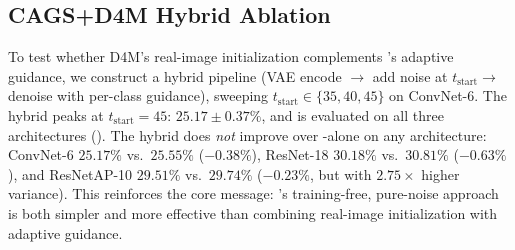 \subsection{CAGS+D4M Hybrid Ablation}
\label{sec:hybrid-ablation}

To test whether D4M's real-image initialization complements \cags{}'s adaptive guidance, we construct a hybrid pipeline (VAE encode $\to$ add noise at $t_{\text{start}} \to$ denoise with per-class \cags{} guidance), sweeping $t_{\text{start}} \in \{35, 40, 45\}$ on ConvNet-6. The hybrid peaks at $t_{\text{start}}{=}45$: $25.17 \pm 0.37\%$, and is evaluated on all three architectures (). The hybrid does \emph{not} improve over \cags{}-alone on any architecture: ConvNet-6 $25.17\%$ vs.\ $25.55\%$ ($-0.38\%$), ResNet-18 $30.18\%$ vs.\ $30.81\%$ ($-0.63\%$), and ResNetAP-10 $29.51\%$ vs.\ $29.74\%$ ($-0.23\%$, but with $2.75\times$ higher variance). This reinforces the core message: \cags{}'s training-free, pure-noise approach is both simpler and more effective than combining real-image initialization with adaptive guidance.
